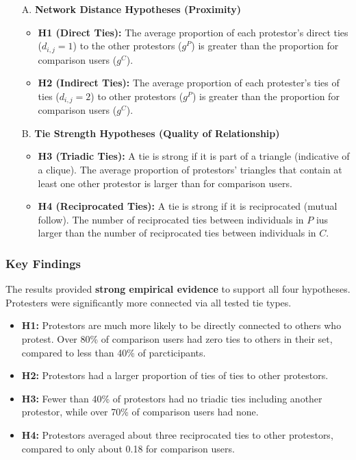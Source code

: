 \documentclass{article}
\begin{document}
    \begin{itemize}
        \item [A.] \textbf{Network Distance Hypotheses (Proximity)}
        \begin{itemize}
            \item \textbf{H1 (Direct Ties):} The average proportion of each
            protestor's direct ties ($d_{i,j} = 1$) to the other protestors ($g^P$) is greater than the proportion for comparison users ($g^C$).
            \item \textbf{H2 (Indirect Ties):} The average proportion of
            each protester's ties of ties ($d_{i,j} = 2$) to other
            protestors ($g^P$) is greater than the proportion for comparison
            users ($g^C$).
        \end{itemize}
        \item[B.] \textbf{Tie Strength Hypotheses (Quality of Relationship)}
        \begin{itemize}
            \item \textbf{H3 (Triadic Ties):} A tie is strong if it is part
            of a triangle (indicative of a clique). The average proportion
            of protestors' triangles that contain at least one other
            protestor is larger than for comparison users.
            \item \textbf{H4 (Reciprocated Ties):} A tie is strong if it is
            reciprocated (mutual follow). The number of reciprocated ties
            between individuals in $P$ ius larger than the number of
            reciprocated ties between individuals in $C$.
        \end{itemize}
    \end{itemize}

    \subsubsection{Key Findings}

    \noindent The results provided \textbf{strong empirical evidence} to
support all four hypotheses. Protesters were significantly more connected
via all tested tie types.
    \begin{itemize}
        \item \textbf {H1:} Protestors are much more likely to be directly
        connected to others who protest. Over 80\% of comparison users had
        zero ties to others in their set, compared to less than 40\% of
        parcticipants.
        \item \textbf{H2:} Protestors had a larger proportion of ties of
        ties to other protestors.
        \item \textbf{H3:} Fewer than 40\% of protestors had no triadic ties
        including another protestor, while over 70\% of comparison users had
        none.
        \item \textbf{H4:} Protestors averaged about three reciprocated ties
        to other protestors, compared to only about 0.18 for comparison users.
    \end{itemize}
\end{document}
